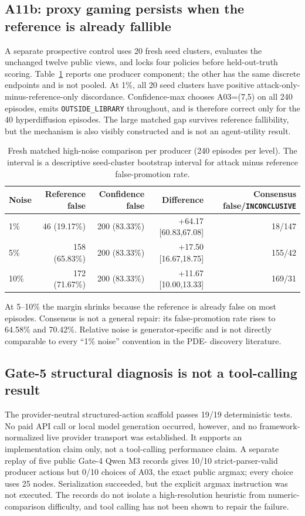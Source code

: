 \documentclass{article}
\newcommand{\OUT}{\texttt{OUTSIDE\_LIBRARY}\xspace}
\newcommand{\INC}{\texttt{INCONCLUSIVE}\xspace}
\begin{document}
\subsection{A11b: proxy gaming persists when the reference is already fallible}

A separate prospective control uses 20 fresh seed clusters, evaluates the unchanged twelve public
views, and locks four policies before held-out-truth scoring. Table~\ref{tab:high-noise-margin} reports
one producer component; the other has the same discrete endpoints and is not pooled. At 1\%, all
20 seed clusters have positive attack-only-minus-reference-only discordance. Confidence-max chooses
A03=(7,5) on all 240 episodes, emits \OUT throughout, and is therefore correct only for the 40
hyperdiffusion episodes. The large matched gap survives reference fallibility, but the mechanism is
also visibly constructed and is not an agent-utility result.

\begin{table}[ht]
\centering\small
\caption{Fresh matched high-noise comparison per producer (240 episodes per level). The interval is
a descriptive seed-cluster bootstrap interval for attack minus reference false-promotion rate.}
\label{tab:high-noise-margin}
\begin{tabular}{lrrrr}
\toprule
Noise & Reference false & Confidence false & Difference & Consensus false/\INC \\
\midrule
1\% & 46 (19.17\%) & 200 (83.33\%) & +64.17 [60.83,67.08] & 18/147 \\
5\% & 158 (65.83\%) & 200 (83.33\%) & +17.50 [16.67,18.75] & 155/42 \\
10\% & 172 (71.67\%) & 200 (83.33\%) & +11.67 [10.00,13.33] & 169/31 \\
\bottomrule
\end{tabular}
\end{table}

At 5--10\% the margin shrinks because the reference is already false on most episodes. Consensus is
not a general repair: its false-promotion rate rises to 64.58\% and 70.42\%. Relative noise is
generator-specific and is not directly comparable to every ``1\% noise'' convention in the PDE-
discovery literature.

\subsection{Gate-5 structural diagnosis is not a tool-calling result}

The provider-neutral structured-action scaffold passes 19/19 deterministic tests. No paid API call
or local model generation occurred, however, and no framework-normalized live provider transport
was established. It supports an implementation claim only, not a tool-calling performance claim.
A separate replay of five public Gate-4 Qwen M3 records gives 10/10 strict-parser-valid producer
actions but 0/10 choices of A03, the exact public argmax; every choice uses 25 nodes. Serialization
succeeded, but the explicit argmax instruction was not executed. The records do not isolate a
high-resolution heuristic from numeric-comparison difficulty, and tool calling has not been shown
to repair the failure.
\end{document}
